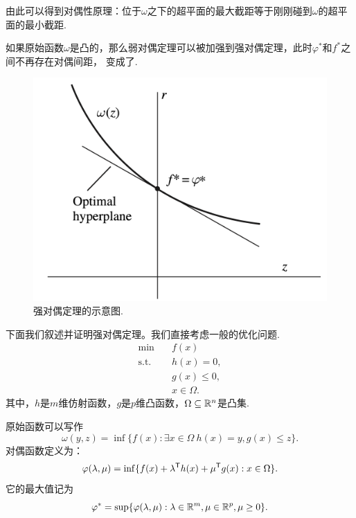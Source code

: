 由此可以得到对偶性原理：位于$\omega$之下的超平面的最大截距等于刚刚碰到$\omega$的超平面的最小截距.

如果原始函数$\omega$是凸的，那么弱对偶定理可以被加强到强对偶定理，此时$\varphi^*$和$f^\ast$之间不再存在对偶间距， 变成了.

\begin{figure}
    \centering
    \includegraphics[scale=0.3]{Chapters/duality/figures/strong-dual.png}
    \caption{强对偶定理的示意图.}
    \label{fig:strong-dual}
\end{figure}

下面我们叙述并证明强对偶定理。我们直接考虑一般的优化问题.
\begin{equation}
        \begin{aligned}
    \min\quad & f({x}) \\
    \text{s.t.}\quad& {h(x)=0}, \\
    &g(x)\leq 0, \\
    &{x}\in\Omega.
    \end{aligned}\label{eq:mix-dual}
\end{equation}
其中，${h}$是$m$维仿射函数，${g}$是$p$维凸函数，$\Omega\subseteq\mathbb{R}^n$是凸集. 

原始函数可以写作
    \[\omega(y,z)=\inf\{f(x):\exists x\in\Omega\ h(x)=y, g(x)\leq z\}.\]
对偶函数定义为：$$\varphi({\lambda,\mu})=\inf\{f({x})+{\lambda^{\mathsf{T}} h(x)+\mu^{\mathsf{T}} g(x):x}\in\Omega\}.$$
它的最大值记为
    $$\varphi^\ast=\sup\{\varphi({\lambda,\mu}):{\lambda}\in \mathbb{R}^m,{\mu}\in \mathbb{R}^p,{\mu}\ge {0}\}.$$

